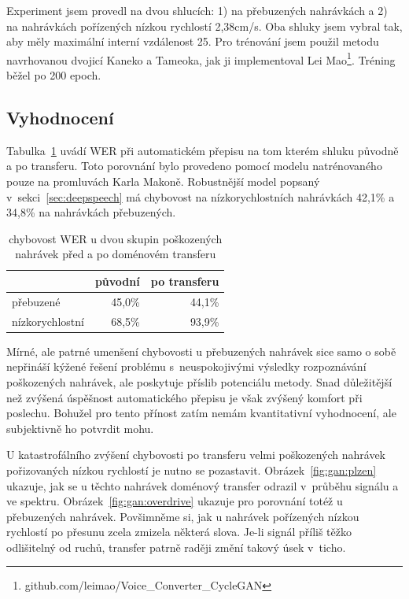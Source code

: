 Experiment jsem provedl na dvou shlucích: 1) na přebuzených nahrávkách a 2) na
nahrávkách pořízených nízkou rychlostí 2,38cm/s. Oba shluky jsem vybral tak, aby
měly maximální interní vzdálenost 25. Pro trénování jsem použil metodu
navrhovanou dvojicí Kaneko a Tameoka\cite{kaneko2017parallel}, jak ji
implementoval Lei Mao\footnote{github.com/leimao/Voice\_Converter\_CycleGAN}.
Tréning běžel po 200 epoch.

\subsection{Vyhodnocení}
\label{sec:akustika:vyhodnoceni}

Tabulka~\ref{tab:ganeval} uvádí WER při automatickém přepisu na tom kterém
shluku původně a po transferu. Toto porovnání bylo provedeno pomocí modelu
natrénovaného pouze na promluvách Karla Makoně. Robustnější model popsaný
v~sekci~\ref{sec:deepspeech} má chybovost na nízkorychlostních nahrávkách
42,1\% %
a 34,8\%  %
na nahrávkách přebuzených.

\begin{table}[htpb]
\begin{center}
\begin{tabular}{|l||r|r|}
\hline
                 & původní & po transferu \\
\hline
přebuzené        & 45,0\%   & 44,1\% \\
nízkorychlostní  & 68,5\%   & 93,9\% \\
\hline
\end{tabular}
\caption{chybovost WER u dvou skupin poškozených nahrávek před a po doménovém
transferu}\label{tab:ganeval}
\end{center}
\end{table}

Mírné, ale patrné umenšení chybovosti u přebuzených nahrávek sice samo o sobě
nepřináší kýžené řešení problému s~neuspokojivými výsledky rozpoznávání
poškozených nahrávek, ale poskytuje příslib potenciálu metody. Snad důležitější
než zvýšená úspěšnost automatického přepisu je však zvýšený komfort při
poslechu. Bohužel pro tento přínost zatím nemám kvantitativní vyhodnocení, ale
subjektivně ho potvrdit mohu.

U katastrofálního zvýšení chybovosti po transferu velmi poškozených nahrávek
pořizovaných nízkou rychlostí je nutno se pozastavit.
Obrázek~\ref{fig:gan:plzen} ukazuje, jak se u těchto nahrávek doménový transfer
odrazil v~průběhu signálu a ve spektru. Obrázek~\ref{fig:gan:overdrive} ukazuje
pro porovnání totéž u přebuzených nahrávek. Povšimněme si, jak u nahrávek
pořízených nízkou rychlostí po přesunu zcela zmizela některá slova. Je-li signál
příliš těžko odlišitelný od ruchů, transfer patrně raději změní takový úsek
v~ticho.

